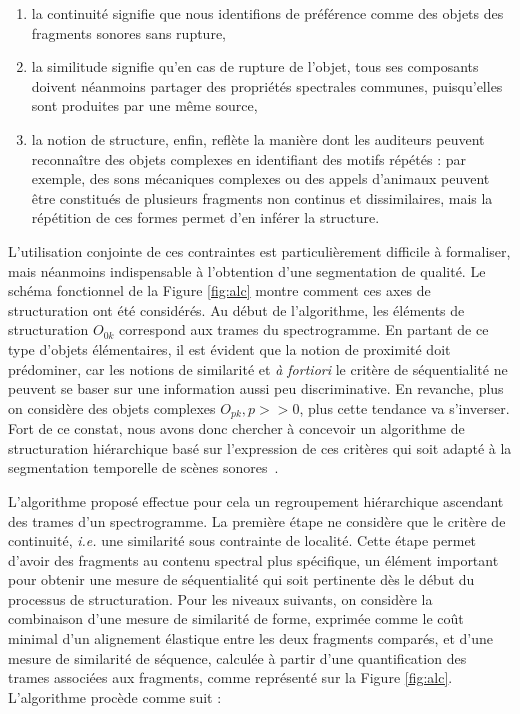 \begin{enumerate}
  \item la continuité signifie que nous identifions de préférence comme des objets des fragments sonores sans rupture,
  \item la similitude signifie qu'en cas de rupture de l'objet, tous ses composants doivent néanmoins partager des propriétés spectrales communes, puisqu'elles sont produites par une même source,
  \item la notion de  structure, enfin, reflète la manière dont les auditeurs peuvent reconnaître des objets complexes en identifiant des motifs répétés : par exemple, des sons mécaniques complexes ou des appels d'animaux peuvent être constitués de plusieurs fragments non continus et dissimilaires, mais la répétition de ces formes permet d'en inférer la structure.
\end{enumerate}


L'utilisation conjointe de ces contraintes est particulièrement difficile à formaliser, mais néanmoins indispensable à l'obtention d'une segmentation de qualité. Le schéma fonctionnel de la Figure \ref{fig:alc} montre comment ces axes de structuration ont été considérés. Au début de l'algorithme, les éléments de structuration $O_{0 k}$ correspond aux trames du spectrogramme. En partant de ce type d'objets élémentaires, il est évident que la notion de proximité doit prédominer, car les notions de similarité et \textit{à fortiori} le critère de séquentialité ne peuvent se baser sur une information aussi peu discriminative.  En revanche, plus on considère des objets complexes $O_{p k}, p >> 0$, plus cette tendance va s'inverser. Fort de ce constat, nous avons donc chercher à concevoir un algorithme de structuration hiérarchique basé sur l'expression de ces critères qui soit adapté à la segmentation temporelle de scènes sonores~\cite{rossignolhal-01122006}.



L'algorithme proposé effectue pour cela un regroupement hiérarchique ascendant des trames d'un spectrogramme. La première étape ne considère que le  critère de continuité, \textit{i.e.} une similarité sous contrainte de localité. Cette étape permet d'avoir des fragments au contenu spectral plus spécifique, un élément important pour obtenir une mesure de séquentialité qui soit pertinente dès le début du processus de structuration. Pour les niveaux suivants, on considère la combinaison d'une mesure de similarité de forme, exprimée comme le coût minimal d'un alignement élastique entre les deux fragments comparés, et d'une mesure de similarité de séquence, calculée à partir d'une quantification des trames associées aux fragments, comme représenté sur la Figure \ref{fig:alc}. L'algorithme procède comme suit :

